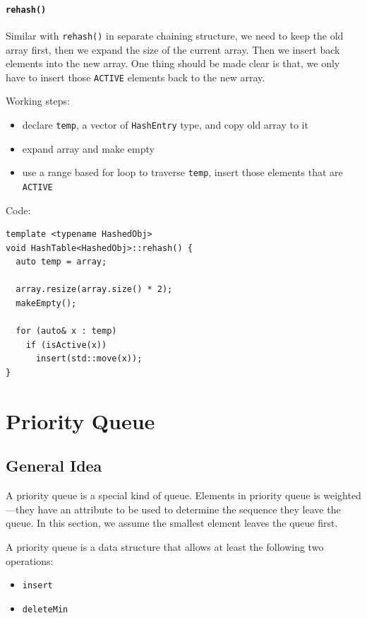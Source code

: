 \documentclass[11pt]{book}
\begin{document}
\subsubsection{\texttt{rehash()}}
\label{sec:org72697be}
Similar with \texttt{rehash()} in separate chaining structure, we need to keep the old array first, then we expand the size of the current array. Then we insert back elements into the new array. One thing should be made clear is that, we only have to insert those \texttt{ACTIVE} elements back to the new array.

Working steps:
\begin{itemize}
\item declare \texttt{temp}, a vector of \texttt{HashEntry} type, and copy old array to it
\item expand array and make empty
\item use a range based for loop to traverse \texttt{temp}, insert those elements that are \texttt{ACTIVE}
\end{itemize}

Code:
\begin{verbatim}
template <typename HashedObj>
void HashTable<HashedObj>::rehash() {
  auto temp = array;

  array.resize(array.size() * 2);
  makeEmpty();

  for (auto& x : temp)
    if (isActive(x))
      insert(std::move(x));
}
\end{verbatim}

\chapter{Priority Queue}
\label{sec:org7add06b}
\section{General Idea}
\label{sec:org232e946}
A priority queue is a special kind of queue. Elements in priority queue is weighted---they have an attribute to be used to determine the sequence they leave the queue. In this section, we assume the smallest element leaves the queue first.

A priority queue is a data structure that allows at least the following two operations:
\begin{itemize}
\item \texttt{insert}
\item \texttt{deleteMin}
\end{itemize}
\end{document}
